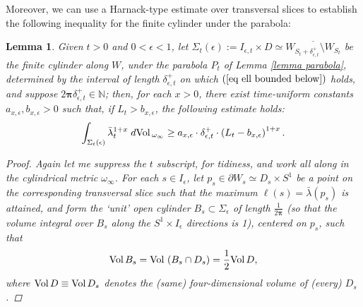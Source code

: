 \documentclass{article}
\newcommand{\func}[1]{\textnormal {#1\,}}
\newcommand{\bl}{\bar\lambda}
\newcommand{\vol}{\func{Vol}}
\newtheorem{lemma}[theorem]{Lemma}
\begin{document}
Moreover, we can use a Harnack-type estimate over transversal slices to establish the following inequality for the finite cylinder under the parabola:
\begin{lemma}   \label{lemma Moser}
Given $t>0$ and $0<\epsilon<1$, let $\Sigma_{t}(\epsilon):= I_{\epsilon,t}\times D \simeq \overline{W_{S_t+\delta^+_{\epsilon,t}}\setminus W_{S_t}}$ be the finite cylinder along $W$, under the parabola $P_t$ of \emph{Lemma \ref{lemma parabola}}, determined by the interval of length $\delta^+_{\epsilon,t}$ on which $(\ref{eq ell bounded below})$ holds, and suppose ${2\mathbf{\pi}}\delta^+_{\epsilon,t}\in\mathbb{N}$; then, for each $x>0$, there exist time-uniform constants $ a_{x,\epsilon},b_{x,\epsilon}>0$ such that, if $L_t>b_{x,\epsilon}$, the following estimate holds:
\begin{equation}        \label{eq lower bound over 'half' the cylinder}
        \int_{\Sigma_{t}(\epsilon)}\bl_t^{1+x} \; 
        d\vol_{\omega_\infty} 
        \geq a_{x,\epsilon} 
        \cdot \delta^+_{\epsilon,t}
        \cdot \left(L_t-b_{x, \epsilon} \right)^{1+x}. 
\end{equation}
\begin{proof}  
Again let me suppress the $t$ subscript, for tidiness, and work all along in the cylindrical metric $\omega_\infty$. For each $s\in I_\epsilon$, let $p_s\in \partial W_s \simeq D_s\times S^1$ be a point on the corresponding transversal slice such that the maximum $\ell(s)=\bl(p_s)$ is attained, and form the `unit' open cylinder $B_s\subset \Sigma_\epsilon$ of length $\frac{1}{2\mathbf{\pi}}$ (so that the volume integral over $B_s$ along the $S^1\times I_\epsilon$ directions is 1), centered on $p_s$, such that 
\begin{displaymath}
        \vol B_s = \vol \left( B_s\cap D_s \right) = \frac{1}{2} \vol D,
\end{displaymath}
where $\vol D\equiv \vol D_s$ denotes the (same) four-dimensional volume of (every) $D_s$.


\end{proof}
\end{lemma}
\end{document}
